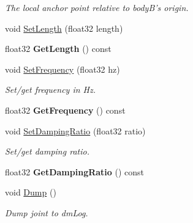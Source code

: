 \begin{DoxyCompactItemize}
\begin{DoxyCompactList}\small\item\em The local anchor point relative to body\-B's origin. \end{DoxyCompactList}\item 
void \hyperlink{classb2_distance_joint_a950a0f187ef691208e50de40ed9223fe}{Set\-Length} (float32 length)
\item 
\hypertarget{classb2_distance_joint_abd3c4bef772c179e4e1d39056335ddf8}{float32 {\bfseries Get\-Length} () const }\label{classb2_distance_joint_abd3c4bef772c179e4e1d39056335ddf8}

\item 
\hypertarget{classb2_distance_joint_a1a12446f8926a1324edd481d9cd28c8a}{void \hyperlink{classb2_distance_joint_a1a12446f8926a1324edd481d9cd28c8a}{Set\-Frequency} (float32 hz)}\label{classb2_distance_joint_a1a12446f8926a1324edd481d9cd28c8a}

\begin{DoxyCompactList}\small\item\em Set/get frequency in Hz. \end{DoxyCompactList}\item 
\hypertarget{classb2_distance_joint_a7b50b34335055ac815d9a1a38ac318f0}{float32 {\bfseries Get\-Frequency} () const }\label{classb2_distance_joint_a7b50b34335055ac815d9a1a38ac318f0}

\item 
\hypertarget{classb2_distance_joint_a58da61301a1f1398a715107b76649923}{void \hyperlink{classb2_distance_joint_a58da61301a1f1398a715107b76649923}{Set\-Damping\-Ratio} (float32 ratio)}\label{classb2_distance_joint_a58da61301a1f1398a715107b76649923}

\begin{DoxyCompactList}\small\item\em Set/get damping ratio. \end{DoxyCompactList}\item 
\hypertarget{classb2_distance_joint_adb86c244721abd89abdd825bf17eb334}{float32 {\bfseries Get\-Damping\-Ratio} () const }\label{classb2_distance_joint_adb86c244721abd89abdd825bf17eb334}

\item 
\hypertarget{classb2_distance_joint_a3cebcc6ccce6f3c24432cd130fd53517}{void \hyperlink{classb2_distance_joint_a3cebcc6ccce6f3c24432cd130fd53517}{Dump} ()}\label{classb2_distance_joint_a3cebcc6ccce6f3c24432cd130fd53517}

\begin{DoxyCompactList}\small\item\em Dump joint to dm\-Log. \end{DoxyCompactList}\end{DoxyCompactItemize}
